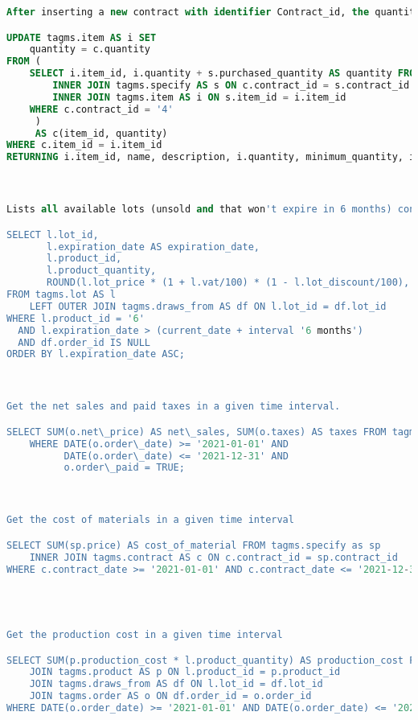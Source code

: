 \begin{lstlisting}[language=SQL,
keywordstyle=\color{blue},
stringstyle=\color{mauve},
showstringspaces=false,
basicstyle=\ttfamily\footnotesize]
After inserting a new contract with identifier Contract_id, the quantities of items in stock must be incremented in the delivery date.

UPDATE tagms.item AS i SET
    quantity = c.quantity
FROM (
    SELECT i.item_id, i.quantity + s.purchased_quantity AS quantity FROM tagms.contract AS c
        INNER JOIN tagms.specify AS s ON c.contract_id = s.contract_id
        INNER JOIN tagms.item AS i ON s.item_id = i.item_id
    WHERE c.contract_id = '4'
     )
     AS c(item_id, quantity)
WHERE c.item_id = i.item_id
RETURNING i.item_id, name, description, i.quantity, minimum_quantity, item_category_id;



Lists all available lots (unsold and that won't expire in 6 months) containing a particular product having a given Product\_id as identifier, sorted by expiration date (oldest lots must be sold first).

SELECT l.lot_id,
       l.expiration_date AS expiration_date,
       l.product_id,
       l.product_quantity,
       ROUND(l.lot_price * (1 + l.vat/100) * (1 - l.lot_discount/100), 2) AS gross_price
FROM tagms.lot AS l
    LEFT OUTER JOIN tagms.draws_from AS df ON l.lot_id = df.lot_id
WHERE l.product_id = '6'
  AND l.expiration_date > (current_date + interval '6 months')
  AND df.order_id IS NULL
ORDER BY l.expiration_date ASC;



Get the net sales and paid taxes in a given time interval.

SELECT SUM(o.net\_price) AS net\_sales, SUM(o.taxes) AS taxes FROM tagms.order AS o
    WHERE DATE(o.order\_date) >= '2021-01-01' AND
          DATE(o.order\_date) <= '2021-12-31' AND
          o.order\_paid = TRUE;



Get the cost of materials in a given time interval

SELECT SUM(sp.price) AS cost_of_material FROM tagms.specify as sp
    INNER JOIN tagms.contract AS c ON c.contract_id = sp.contract_id
WHERE c.contract_date >= '2021-01-01' AND c.contract_date <= '2021-12-31';




Get the production cost in a given time interval

SELECT SUM(p.production_cost * l.product_quantity) AS production_cost FROM tagms.lot AS l
    JOIN tagms.product AS p ON l.product_id = p.product_id
    JOIN tagms.draws_from AS df ON l.lot_id = df.lot_id
    JOIN tagms.order AS o ON df.order_id = o.order_id
WHERE DATE(o.order_date) >= '2021-01-01' AND DATE(o.order_date) <= '2021-12-31';




\end{lstlisting}
